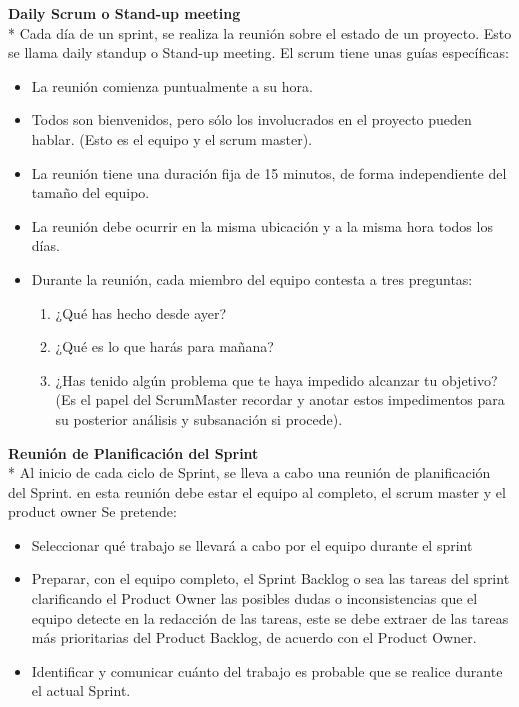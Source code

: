\documentclass[../pfc.tex]{subfiles}
\begin{document}
	\textbf{Daily Scrum o Stand-up meeting}\\*
	Cada día de un sprint, se realiza la reunión sobre el estado de un proyecto. Esto se llama daily standup o Stand-up meeting. El scrum tiene unas guías específicas:
	\begin{itemize} 
		\item La reunión comienza puntualmente a su hora. 
		\item Todos son bienvenidos, pero sólo los involucrados en el proyecto pueden hablar. (Esto es el equipo y el scrum master). 
		\item La reunión tiene una duración fija de 15 minutos, de forma independiente del tamaño del equipo.
		\item La reunión debe ocurrir en la misma ubicación y a la misma hora todos los días.
		\item Durante la reunión, cada miembro del equipo contesta a tres preguntas:
		\begin{enumerate}
			\item ¿Qué has hecho desde ayer?
			\item ¿Qué es lo que harás para mañana?
			\item ¿Has tenido algún problema que te haya impedido alcanzar tu objetivo? (Es el papel del ScrumMaster recordar y anotar estos impedimentos para su posterior análisis y subsanación si procede).
		\end{enumerate} 
	\end{itemize}
	
	\textbf{Reunión de Planificación del Sprint }\\*
	Al inicio de cada ciclo de Sprint, se lleva a cabo una reunión de planificación del Sprint. en esta reunión debe estar el equipo al completo, el scrum master y el product owner Se pretende:
	\begin{itemize} 
		\item Seleccionar qué trabajo se llevará a cabo por el equipo durante el sprint 
		\item Preparar, con el equipo completo, el Sprint Backlog o sea las tareas del sprint clarificando el Product Owner las posibles dudas o  inconsistencias que el equipo detecte en la redacción de las tareas, este se debe extraer de las tareas más prioritarias del Product Backlog, de acuerdo con el Product Owner. 
		\item Identificar y comunicar cuánto del trabajo es probable que se realice durante el actual Sprint.
	\end{itemize}
	
\end{document}
